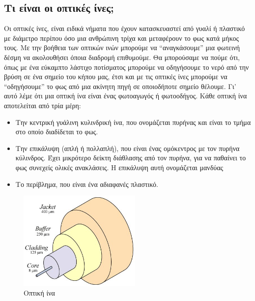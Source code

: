 \documentclass[a4paper,11pt,titlepage]{article}
\begin{document}
\subsection{Τι είναι οι οπτικές ίνες;}
Οι οπτικές ίνες, είναι ειδικά νήματα που έχουν κατασκευαστεί από γυαλί ή πλαστικό με διάμετρο περίπου όσο μια ανθρώπινη τρίχα και μεταφέρουν το φως κατά μήκος τους. Με την βοήθεια των οπτικών ινών μπορούμε να “αναγκάσουμε” μια φωτεινή δέσμη να ακολουθήσει όποια διαδρομή επιθυμούμε. Θα μπορούσαμε να πούμε ότι, όπως με ένα εύκαμπτο λάστιχο ποτίσματος μπορούμε να οδηγήσουμε το νερό από την βρύση σε ένα σημείο του κήπου μας, έτσι και με τις οπτικές ίνες μπορούμε να “οδηγήσουμε” το φως από μια ακίνητη πηγή σε οποιοδήποτε σημείο θέλουμε. Γι’ αυτό λέμε ότι μια οπτική ίνα είναι ένας φωτοαγωγός ή φωτοοδήγος. Kάθε οπτική ίνα αποτελείται από τρία μέρη:
\begin{itemize}
\item Την κεντρική γυάλινη κυλινδρική ίνα, που ονομάζεται πυρήνας και είναι το τμήμα στο οποίο διαδίδεται το φως.
\item Την επικάλυψη (απλή ή πολλαπλή), που είναι ένας ομόκεντρος με τον πυρήνα κύλινδρος. Έχει μικρότερο δείκτη διάθλασης από τον πυρήνα, για να παθαίνει το φως συνεχείς ολικές ανακλάσεις. Η επικάλυψη αυτή ονομάζεται μανδύας
\item Το περίβλημα, που είναι ένα αδιαφανές πλαστικό.
\end{itemize}

\begin{figure} [hp!]
\centering
\includegraphics[width=60mm]{cable.jpg}
\caption{Οπτική ίνα}
\end{figure}
\newpage
\end{document}
